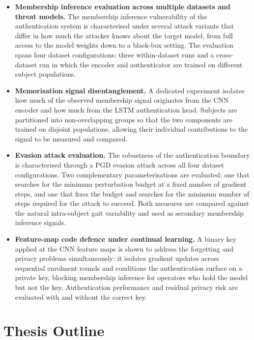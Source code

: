 \begin{itemize}

  \item \textbf{Membership inference evaluation across multiple datasets and threat models.}
  The membership inference vulnerability of the authentication system is characterised under several attack variants that differ in how much the attacker knows about the target model, from full access to the model weights down to a black-box setting. The evaluation spans four dataset configurations: three within-dataset runs and a cross-dataset run in which the encoder and authenticator are trained on different subject populations.

  \item \textbf{Memorisation signal disentanglement.}
  A dedicated experiment isolates how much of the observed membership signal originates from the CNN encoder and how much from the LSTM authentication head. Subjects are partitioned into non-overlapping groups so that the two components are trained on disjoint populations, allowing their individual contributions to the signal to be measured and compared.

  \item \textbf{Evasion attack evaluation.}
  The robustness of the authentication boundary is characterised through a PGD evasion attack across all four dataset configurations. Two complementary parameterisations are evaluated: one that searches for the minimum perturbation budget at a fixed number of gradient steps, and one that fixes the budget and searches for the minimum number of steps required for the attack to succeed. Both measures are compared against the natural intra-subject gait variability and used as secondary membership inference signals.

  \item \textbf{Feature-map code defence under continual learning.}
  A binary key applied at the CNN feature maps is shown to address the forgetting and privacy problems simultaneously: it isolates gradient updates across sequential enrolment rounds and conditions the authentication surface on a private key, blocking membership inference for operators who hold the model but not the key. Authentication performance and residual privacy risk are evaluated with and without the correct key.

\end{itemize}

\section{Thesis Outline}
\label{sec:intro_outline}

